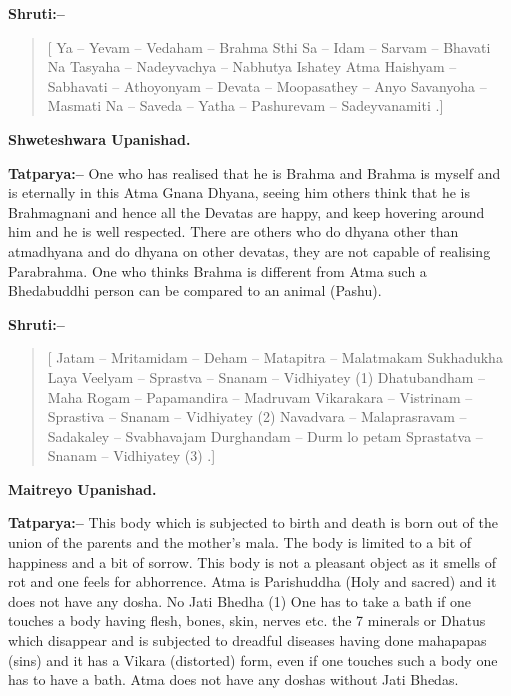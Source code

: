 \textbf{Shruti:–}

\begin{verse}
[ Ya – Yevam – Vedaham – Brahma Sthi  Sa – Idam – Sarvam – Bhavati  Na Tasyaha – Nadeyvachya – Nabhutya Ishatey  Atma Haishyam – Sabhavati – Athoyonyam – Devata – Moopasathey – Anyo  Savanyoha – Masmati  Na – Saveda – Yatha – Pashurevam – Sadeyvanamiti .]
\end{verse}

\begin{flushright}
\textbf{Shweteshwara Upanishad.}
\end{flushright}

\textbf{Tatparya:–} One who has realised that he is Brahma and Brahma is myself and is eternally in this Atma Gnana Dhyana, seeing him others think that he is Brahmagnani and hence all the Devatas are happy, and keep hovering around him and he is well respected. There are others who do dhyana other than atmadhyana and do dhyana on other devatas, they are not capable of realising Parabrahma. One who thinks Brahma is different from Atma such a Bhedabuddhi person can be compared to an animal (Pashu).

\textbf{Shruti:–}

\begin{verse}
[ Jatam – Mritamidam – Deham – Matapitra – Malatmakam  Sukhadukha Laya Veelyam – Sprastva – Snanam – Vidhiyatey  (1) Dhatubandham – Maha Rogam – Papamandira – Madruvam  Vikarakara – Vistrinam – Sprastiva – Snanam – Vidhiyatey  (2) Navadvara – Malaprasravam – Sadakaley – Svabhavajam  Durghandam – Durm lo petam Sprastatva – Snanam – Vidhiyatey (3) .]
\end{verse}

\begin{flushright}
\textbf{Maitreyo Upanishad.}
\end{flushright}

\textbf{Tatparya:–} This body which is subjected to birth and death is born out of the union of the parents and the mother's mala. The body is limited to a bit of happiness and a bit of sorrow. This body is not a pleasant object as it smells of rot and one feels for abhorrence. Atma is Parishuddha (Holy and sacred) and it does not have any dosha. No Jati Bhedha (1) One has to take a bath if one touches a body having flesh, bones, skin, nerves etc. the 7 minerals or Dhatus which disappear and is subjected to dreadful diseases having done mahapapas (sins) and it has a Vikara (distorted) form, even if one touches such a body one has to have a bath. Atma does not have any doshas without Jati Bhedas.

